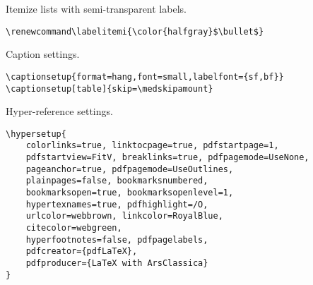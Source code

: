 Itemize lists with semi-transparent labels.
\begin{lstlisting}
\renewcommand\labelitemi{\color{halfgray}$\bullet$}
\end{lstlisting}



Caption settings.
\begin{lstlisting}
\captionsetup{format=hang,font=small,labelfont={sf,bf}}
\captionsetup[table]{skip=\medskipamount}
\end{lstlisting}



Hyper-reference settings.
\begin{lstlisting}
\hypersetup{
    colorlinks=true, linktocpage=true, pdfstartpage=1,
    pdfstartview=FitV, breaklinks=true, pdfpagemode=UseNone,
    pageanchor=true, pdfpagemode=UseOutlines,
    plainpages=false, bookmarksnumbered,
    bookmarksopen=true, bookmarksopenlevel=1,
    hypertexnames=true, pdfhighlight=/O,
    urlcolor=webbrown, linkcolor=RoyalBlue,
    citecolor=webgreen,
    hyperfootnotes=false, pdfpagelabels,
    pdfcreator={pdfLaTeX},
    pdfproducer={LaTeX with ArsClassica}
}
\end{lstlisting}
